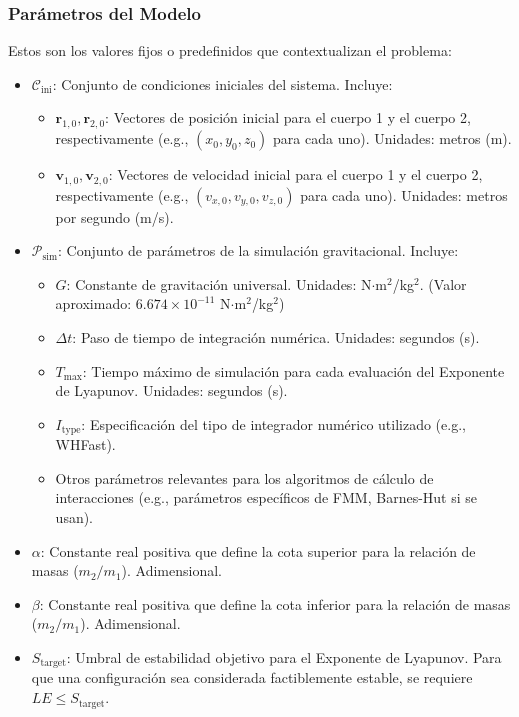 \subsubsection{Parámetros del Modelo}%
\label{ssubsec:parametros_modelo}
Estos son los valores fijos o predefinidos que contextualizan el problema:
\begin{itemize}
    \item $\mathcal{C}_{\text{ini}}$: Conjunto de condiciones iniciales del sistema. Incluye:
    \begin{itemize}
        \item $\mathbf{r}_{1,0}, \mathbf{r}_{2,0}$: Vectores de posición inicial para el cuerpo 1 y el cuerpo 2, respectivamente (e.g., $(x_0, y_0, z_0)$ para cada uno). Unidades: metros (m).
        \item $\mathbf{v}_{1,0}, \mathbf{v}_{2,0}$: Vectores de velocidad inicial para el cuerpo 1 y el cuerpo 2, respectivamente (e.g., $(v_{x,0}, v_{y,0}, v_{z,0})$ para cada uno). Unidades: metros por segundo (m/s).
    \end{itemize}
    \item $\mathcal{P}_{\text{sim}}$: Conjunto de parámetros de la simulación gravitacional. Incluye:
    \begin{itemize}
        \item $G$: Constante de gravitación universal. Unidades: N$\cdot$m$^2$/kg$^2$. (Valor aproximado: $6.674 \times 10^{-11}$ N$\cdot$m$^2$/kg$^2$)
        \item $\Delta t$: Paso de tiempo de integración numérica. Unidades: segundos (s).
        \item $T_{\text{max}}$: Tiempo máximo de simulación para cada evaluación del Exponente de Lyapunov. Unidades: segundos (s).
        \item $I_{\text{type}}$: Especificación del tipo de integrador numérico utilizado (e.g., WHFast).
        \item Otros parámetros relevantes para los algoritmos de cálculo de interacciones (e.g., parámetros específicos de FMM, Barnes-Hut si se usan).
    \end{itemize}
    \item $\alpha$: Constante real positiva que define la cota superior para la relación de masas ($m_2/m_1$). Adimensional.
    \item $\beta$: Constante real positiva que define la cota inferior para la relación de masas ($m_2/m_1$). Adimensional.
    \item $S_{\text{target}}$: Umbral de estabilidad objetivo para el Exponente de Lyapunov. Para que una configuración sea considerada factiblemente estable, se requiere $LE \leq S_{\text{target}}$.

\end{itemize}
